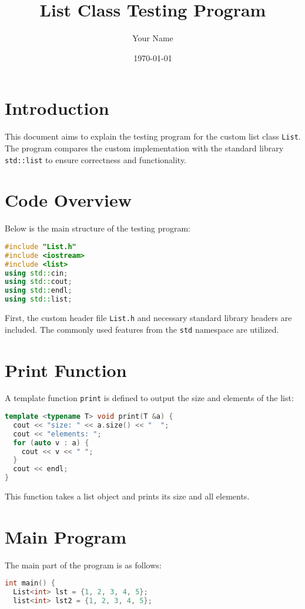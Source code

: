 \documentclass{article}
\title{List Class Testing Program}
\author{Your Name}
\date{\today}
\begin{document}
\maketitle

\section{Introduction}
This document aims to explain the testing program for the custom list class \texttt{List}. The program compares the custom implementation with the standard library \texttt{std::list} to ensure correctness and functionality.

\section{Code Overview}
Below is the main structure of the testing program:

\begin{lstlisting}[language=C++]
#include "List.h"
#include <iostream>
#include <list>
using std::cin;
using std::cout;
using std::endl;
using std::list;
\end{lstlisting}

First, the custom header file \texttt{List.h} and necessary standard library headers are included. The commonly used features from the \texttt{std} namespace are utilized.

\section{Print Function}
A template function \texttt{print} is defined to output the size and elements of the list:

\begin{lstlisting}[language=C++]
template <typename T> void print(T &a) {
  cout << "size: " << a.size() << "  ";
  cout << "elements: ";
  for (auto v : a) {
    cout << v << " ";
  }
  cout << endl;
}
\end{lstlisting}

This function takes a list object and prints its size and all elements.

\section{Main Program}
The main part of the program is as follows:

\begin{lstlisting}[language=C++]
int main() {
  List<int> lst = {1, 2, 3, 4, 5};
  list<int> lst2 = {1, 2, 3, 4, 5};
\end{lstlisting}
\end{document}
